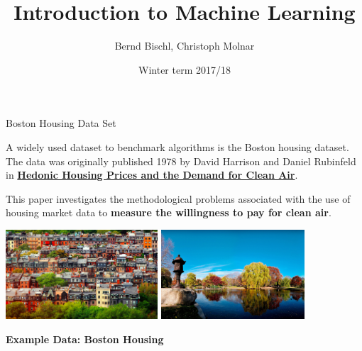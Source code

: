 \documentclass[11pt,compress,t,notes=noshow, xcolor=table]{beamer}
\title{Introduction to Machine Learning}
\author{Bernd Bischl, Christoph Molnar}
\institute{Department of Statistics -- LMU Munich}
\date{Winter term 2017/18}
\begin{document}














\sloppy

\begin{vbframe}{Boston Housing Data Set}




A widely used dataset to benchmark algorithms is the Boston housing dataset.
The data was originally published 1978 by David Harrison and Daniel Rubinfeld in \textbf{\href{https://www.law.berkeley.edu/files/Hedonic.PDF}{Hedonic Housing Prices and the Demand for Clean Air}}.

This paper investigates the methodological problems associated with the use of
housing market data to \textbf{measure the willingness to pay for clean air}.

\begin{center}
\includegraphics[width=0.425\textwidth]{figure_man/boston_housing.png}
\hspace{0.5cm}
\includegraphics[width=0.402\textwidth]{figure_man/boston_housing_park.jpg}
\end{center}

\framebreak

\textbf{Example Data: Boston Housing}


\end{vbframe}
\end{document}
